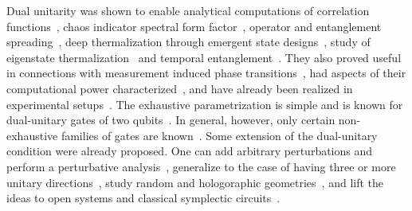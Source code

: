 \documentclass[aps,prx,twocolumn,notitlepage,nofootinbib,nobalancelastpage]{revtex4-2}
\theoremstyle{break}
\newcommand{\1}{\mathbbm{1}}
\theoremstyle{plain}
\theoremstyle{plain}
\theoremstyle{plain}
\newcommand{\pk}[1]{{\color{blue}[#1]}}
\begin{document}
Dual unitarity was shown to enable analytical computations of correlation functions~\cite{bertini2019exact,piroli2020exact},
chaos indicator spectral form factor~\cite{bertini2018exact,bertini2021random}, operator and entanglement spreading~\cite{bertini2019entanglement,bertini2020operator, gopalakrishnan2019unitary, piroli2020exact,claeys2020maximum,bertini2020scrambling, reid2021entanglement, zhou2022maximal}, 
deep thermalization through emergent state designs~\cite{ho2022exact,claeys2022emergent,ippoliti2022dynamical}, study of eigenstate thermalization~\cite{fritzsch2021eigenstate} and
temporal entanglement~\cite{lerose2020influence,Giudice2022temporal, foligno2023temporal}.
They also proved useful in connections with measurement induced phase transitions~\cite{ippoliti2021postselection, ippoliti2021fractal,lu2021spacetime}, had aspects of their computational power characterized~\cite{suzuki2021computational}, and have already been realized in experimental setups~\cite{chertkov2021holographic, mi2021information}. %
%
%
The exhaustive parametrization is simple and is known for dual-unitary gates of two qubits~\cite{bertini2019exact}.
In general, however, only certain non-exhaustive families of gates are known~\cite{rather2020creating, gutkin2020exact, claeys2021ergodic, aravinda2021from,prosen2021manybody, marton2022construction, mestyan2022multidirectional,claeys2023dualunitary}.
Some extension of the dual-unitary condition were already proposed. One can add arbitrary perturbations and perform a perturbative analysis~\cite{kos2021correlations, rampp2023from}, generalize to the case of having three or more unitary directions~\cite{jonay2021triunitary, ternary2022milbradt, mestyan2022multidirectional}, study random and hologoraphic geometries~\cite{kasim2023dual,masanes2023discrete}, and lift the ideas to open systems \cite{kos2023circuits} and classical symplectic circuits~\cite{christopoulos2023dual}.
\end{document}

